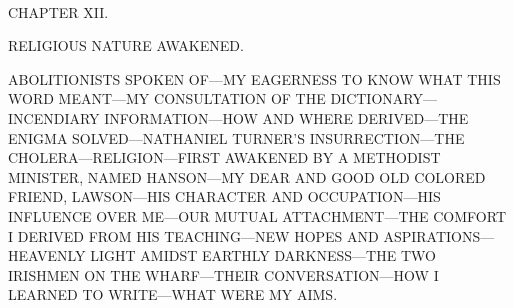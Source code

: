 {\protect\hypertarget{163}{}{}}

~

{CHAPTER XII.}

RELIGIOUS NATURE AWAKENED.

{ABOLITIONISTS SPOKEN OF---MY EAGERNESS TO KNOW WHAT THIS WORD
MEANT---MY CONSULTATION OF THE DICTIONARY---INCENDIARY INFORMATION---HOW
AND WHERE DERIVED---THE ENIGMA SOLVED---NATHANIEL TURNER'S
INSURRECTION---THE CHOLERA---RELIGION---FIRST AWAKENED BY A METHODIST
MINISTER, NAMED HANSON---MY DEAR AND GOOD OLD COLORED FRIEND,
LAWSON---HIS CHARACTER AND OCCUPATION---HIS INFLUENCE OVER ME---OUR
MUTUAL ATTACHMENT---THE COMFORT I DERIVED FROM HIS TEACHING---NEW HOPES
AND ASPIRATIONS---HEAVENLY LIGHT AMIDST EARTHLY DARKNESS---THE TWO
IRISHMEN ON THE WHARF---THEIR CONVERSATION---HOW I LEARNED TO
WRITE---WHAT WERE MY AIMS.}

